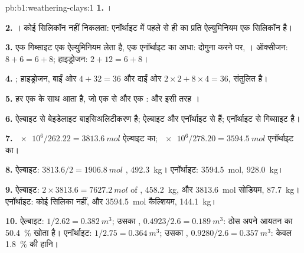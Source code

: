 \begin{solution}{pb:b1:weathering-clays:1}
\textbf{1.} ।

\textbf{2.} । कोई सिलिकॉन नहीं निकलता: एनॉर्थाइट में पहले से ही  का प्रति ऐल्युमिनियम एक सिलिकॉन है।

\textbf{3.} एक गिब्साइट एक ऐल्युमिनियम लेता है, एक एनॉर्थाइट का आधा: दोगुना करने पर,
। ऑक्सीजन:
$8 + 6 = 6 + 8$; हाइड्रोजन: $2 + 12 = 6 + 8$।

\textbf{4.} ; %
हाइड्रोजन, बाईं ओर $4 + 32 = 36$ और दाईं ओर $2\times2 + 8\times4 = 36$, संतुलित है।

\textbf{5.} हर  एक  के साथ आता है, जो एक  से और एक
:
और इसी तरह ।

\textbf{6.} ऐल्बाइट से बेइडेलाइट बाइसिअलिटीकरण है; ऐल्बाइट और एनॉर्थाइट से
  हैं; एनॉर्थाइट से गिब्साइट  है।

\textbf{7.} $\num{e6}/262.22 = \qty{3813.6}{mol}$ ऐल्बाइट का;
$\num{e6}/278.20 = \qty{3594.5}{mol}$ एनॉर्थाइट का।

\textbf{8.} ऐल्बाइट: $3813.6/2 = \qty{1906.8}{mol}$ ,
\qty{492.3}{kg}। एनॉर्थाइट: \qty{3594.5}{mol}, \qty{928.0}{kg}।

\textbf{9.} ऐल्बाइट: $2\times3813.6 = \qty{7627.2}{mol}$ of ,
\qty{458.2}{kg}, और \qty{3813.6}{mol} सोडियम, \qty{87.7}{kg}। एनॉर्थाइट:
कोई सिलिका नहीं, और \qty{3594.5}{mol} कैल्शियम, \qty{144.1}{kg}।

\textbf{10.} ऐल्बाइट: $1/2.62 = \qty{0.382}{m^3}$; उसका ,
$0.4923/2.6 = \qty{0.189}{m^3}$: ठोस अपने आयतन का \qty{50.4}{\percent} खोता है। एनॉर्थाइट: $1/2.75 = \qty{0.364}{m^3}$; उसका ,
$0.9280/2.6 = \qty{0.357}{m^3}$: केवल \qty{1.8}{\percent} की हानि।


\end{solution}
